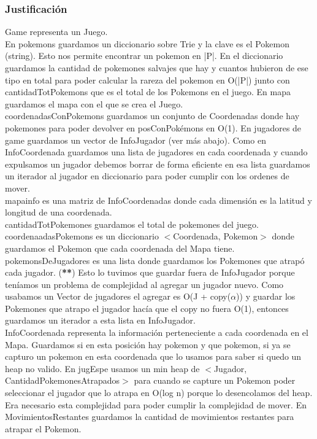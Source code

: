 \begin{Representacion}
\subsubsection{Justificación}
Game representa un Juego.\\
En pokemons guardamos un diccionario sobre Trie y la clave es el Pokemon (string). Esto nos permite encontrar un pokemon en |P|. En el diccionario guardamos la cantidad de pokemones salvajes que hay y cuantos hubieron de ese tipo en total para poder calcular la rareza del pokemon en O(|P|) junto con cantidadTotPokemons que es el total de los Pokemons en el juego.
En mapa guardamos el mapa con el que se crea el Juego.\\
coordenadasConPokemons guardamos un conjunto de Coordenadas donde hay pokemones para poder devolver en posConPok\'emons en O(1).
En jugadores de game guardamos un vector de InfoJugador (ver m\'as abajo). Como en InfoCoordenada guardamos una lista de jugadores en cada coordenada y cuando expulsamos un jugador debemos borrar de forma eficiente en esa lista guardamos un iterador al jugador en diccionario para poder cumplir con los ordenes de mover.\\
mapainfo es una matriz de InfoCoordenadas donde cada dimensi\'on es la latitud y longitud de una coordenada.\\
cantidadTotPokemones guardamos el total de pokemones del juego.\\
coordenaadasPokemons es un diccionario $<$Coordenada, Pokemon$>$ donde guardamos el Pokemon que cada coordenada del Mapa tiene.\\
pokemonsDeJugadores es una lista donde guardamos los Pokemones que atrapó cada jugador. (\textbf{**}) Esto lo tuvimos que guardar fuera de InfoJugador porque ten\'iamos un problema de complejidad al agregar un jugador nuevo. Como usabamos un Vector de jugadores el agregar es O(J + copy($\alpha$)) y guardar los Pokemones que atrapo el jugador hacía que el copy no fuera O(1), entonces guardamos un iterador a esta lista en InfoJugador.\\
InfoCoordenada representa la informaci\'on perteneciente a cada coordenada en el Mapa. Guardamos si en esta posici\'on hay pokemon y que pokemon, si ya se capturo un pokemon en esta coordenada que lo usamos para saber si quedo un heap no valido. En jugEspe usamos un min heap de $<$Jugador, CantidadPokemonesAtrapados$>$ para cuando se capture un Pokemon poder seleccionar el jugador que lo atrapa en O(log n) porque lo desencolamos del heap. Era necesario esta complejidad para poder cumplir la complejidad de mover. En MovimientosRestantes guardamos la cantidad de movimientos restantes para atrapar el Pokemon.\\

\end{Representacion}
